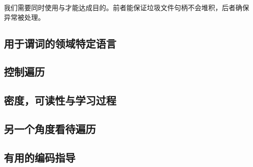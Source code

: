 \documentclass[./main.tex]{subfiles}
\begin{document}
我们需要同时使用与才能达成目的。前者能保证垃圾文件句柄不会堆积，后者确保异常被处理。

\subsection*{用于谓词的领域特定语言}


\subsection*{控制遍历}

\subsection*{密度，可读性与学习过程}

\subsection*{另一个角度看待遍历}

\subsection*{有用的编码指导}
\end{document}
